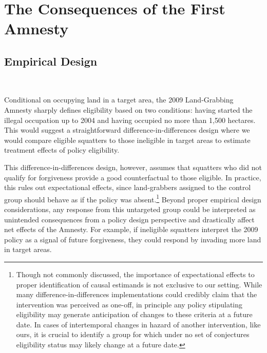 \documentclass[12pt]{article}
\newcommand{\PTR}[1]{{\color{blue}{#1}}}
\begin{document}
\section{The Consequences of the First Amnesty} \label{sec:3}

\PTR{intro paragraph}

\subsection{Empirical Design}

\ 

\quad Conditional on occupying land in a target area, the 2009 Land-Grabbing Amnesty sharply defines eligibility based on two conditions: having started the illegal occupation up to 2004 and having occupied no more than 1,500 hectares. This would suggest a straightforward difference-in-differences design where we would compare eligible squatters to those ineligible in target areas to estimate treatment effects of policy eligibility.
\ 

\quad This difference-in-differences design, however, assumes that squatters who did not qualify for forgiveness provide a good counterfactual to those eligible. In practice, this rules out expectational effects, since land-grabbers assigned to the control group should behave as if the policy was absent.\footnote{Though not commonly discussed, the importance of expectational effects to proper identification of causal estimands is not exclusive to our setting. While many difference-in-differences implementations could credibly claim that the intervention was perceived as one-off, in principle any policy stipulating eligibility may generate anticipation of changes to these criteria at a future date. In cases of intertemporal changes in hazard of another intervention, like ours, it is crucial to identify a group for which under no set of conjectures eligibility status may likely change at a future date.} Beyond proper empirical design considerations, any response from this untargeted group could be interpreted as unintended consequences from a policy design perspective and drastically affect net effects of the Amnesty. For example, if ineligible squatters interpret the 2009 policy as a signal of future forgiveness, they could respond by invading more land in target areas.
\ 
\end{document}
